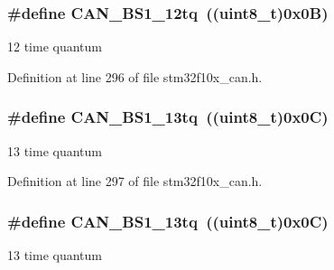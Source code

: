 \subsubsection[{\texorpdfstring{C\+A\+N\+\_\+\+B\+S1\+\_\+12tq}{CAN_BS1_12tq}}]{\setlength{\rightskip}{0pt plus 5cm}\#define C\+A\+N\+\_\+\+B\+S1\+\_\+12tq~(({\bf uint8\+\_\+t})0x0\+B)}\hypertarget{group___c_a_n__time__quantum__in__bit__segment__1_ga14c4e928f615babc14c6a9e80ee86a6c}{}\label{group___c_a_n__time__quantum__in__bit__segment__1_ga14c4e928f615babc14c6a9e80ee86a6c}
12 time quantum 

Definition at line 296 of file stm32f10x\+\_\+can.\+h.

\subsubsection[{\texorpdfstring{C\+A\+N\+\_\+\+B\+S1\+\_\+13tq}{CAN_BS1_13tq}}]{\setlength{\rightskip}{0pt plus 5cm}\#define C\+A\+N\+\_\+\+B\+S1\+\_\+13tq~(({\bf uint8\+\_\+t})0x0\+C)}\hypertarget{group___c_a_n__time__quantum__in__bit__segment__1_ga2087caec94be44837c1e6965da7f6236}{}\label{group___c_a_n__time__quantum__in__bit__segment__1_ga2087caec94be44837c1e6965da7f6236}
13 time quantum 

Definition at line 297 of file stm32f10x\+\_\+can.\+h.

\subsubsection[{\texorpdfstring{C\+A\+N\+\_\+\+B\+S1\+\_\+13tq}{CAN_BS1_13tq}}]{\setlength{\rightskip}{0pt plus 5cm}\#define C\+A\+N\+\_\+\+B\+S1\+\_\+13tq~(({\bf uint8\+\_\+t})0x0\+C)}\hypertarget{group___c_a_n__time__quantum__in__bit__segment__1_ga2087caec94be44837c1e6965da7f6236}{}\label{group___c_a_n__time__quantum__in__bit__segment__1_ga2087caec94be44837c1e6965da7f6236}
13 time quantum 

